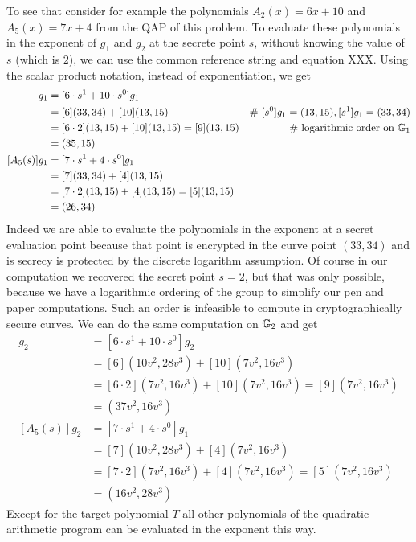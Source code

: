 \begin{example}
To see that consider for example the polynomials $A_2(x)= 6x +10$ and $A_5(x)=7x+4$ from the QAP of this problem. To evaluate these polynomials in the exponent of $g_1$ and $g_2$ at the secrete point $s$, without knowing the value of $s$ (which is $2$), we can use the common reference string and equation XXX. Using the scalar product notation, instead of exponentiation, we get
\begin{align*}
[A_2(s)]g_1 & = [6\cdot s^1 + 10\cdot s^0] g_1 \\
     & = [6](33,34) + [10](13,15) & \text{\# } [s^0]g_1 = (13,15), [s^1]g_1 = (33,34)\\
     & = [6\cdot 2](13,15) + [10](13,15) = [9](13,15) & \text{\# logarithmic order on } \G_1 \\   
     & = (35,15)\\
[A_5(s)]g_1 & = [7\cdot s^1 + 4\cdot s^0] g_1 \\
     & = [7](33,34) + [4](13,15) \\
     & = [7\cdot 2](13,15) + [4](13,15) = [5](13,15)\\
     & = (26,34)     
\end{align*}
Indeed we are able to evaluate the polynomials in the exponent at a secret evaluation point because that point is encrypted in the curve point $(33,34)$ and is secrecy is protected by the discrete logarithm assumption. Of course in our computation we recovered the secret point $s=2$, but that was only possible, because we have a logarithmic ordering of the group to simplify our pen and paper computations. Such an order is infeasible to compute in cryptographically secure curves. We can do the same computation on $\mathbb{G}_2$ and get
\begin{align*}
[A_2(s)]g_2 & = [6\cdot s^1 + 10\cdot s^0] g_2 \\
     & = [6](10v^2,28v^3) + [10](7v^2,16v^3) \\
     & = [6\cdot 2](7v^2,16v^3) + [10](7v^2,16v^3) = [9](7v^2,16v^3) \\   
     & = (37v^2,16v^3)\\
[A_5(s)]g_2 & = [7\cdot s^1 + 4\cdot s^0] g_1 \\
     & = [7](10v^2,28v^3) + [4](7v^2,16v^3) \\
     & = [7\cdot 2](7v^2,16v^3) + [4](7v^2,16v^3) = [5](7v^2,16v^3)\\
     & = (16v^2,28v^3)     
\end{align*}
Except for the target polynomial $T$ all other polynomials of the quadratic arithmetic program can be evaluated in the exponent this way.
\end{example}

